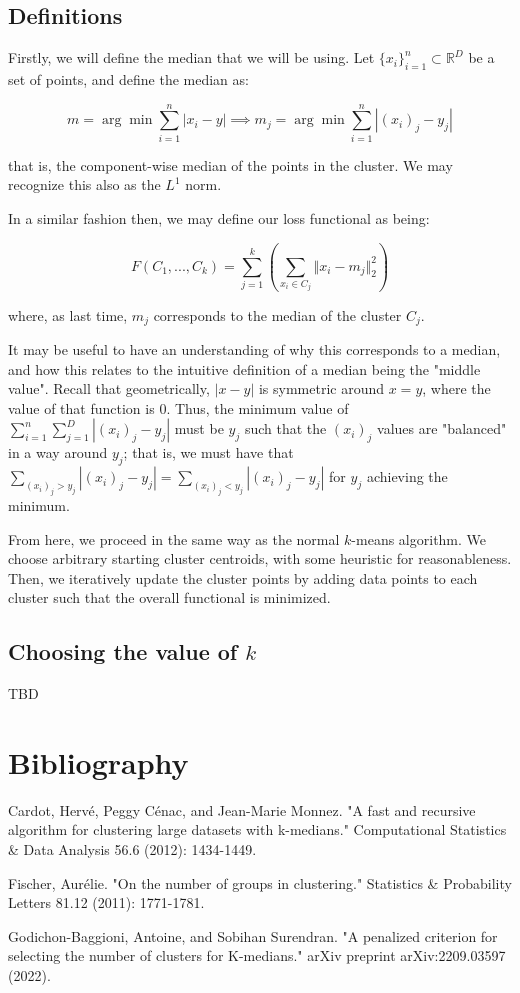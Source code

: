 \documentclass[10pt]{article}
\begin{document}
\subsection{Definitions}

Firstly, we will define the median that we will be using. Let $\{ x_i \}_{i=1}^n \subset \mathbb{R}^D$ be a set of points, and define the median as:

$$ m = \arg \min \sum_{i=1}^n | x_i - y | \implies m_j =  \arg \min \sum_{i=1}^n | (x_i)_j - y_j | $$

that is, the component-wise median of the points in the cluster. We may recognize this also as the $L^1$ norm.

In a similar fashion then, we may define our loss functional as being:

$$F(C_1,...,C_k) = \sum_{j=1}^k \left( \sum_{x_i \in C_j} \Vert x_i - m_j \Vert_2^2 \right)$$

where, as last time, $m_j$ corresponds to the median of the cluster $C_j$.

It may be useful to have an understanding of why this corresponds to a median, and how this relates to the intuitive definition of a median being the "middle value". Recall that geometrically, $|x - y|$ is symmetric around $x = y$, where the value of that function is $0$. Thus, the minimum value of $ \sum_{i=1}^n \sum_{j=1}^D | (x_i)_j - y_j | $ must be $y_j$ such that the $(x_i)_j$ values are "balanced" in a way around $y_j$; that is, we must have that $\sum_{(x_i)_j > y_j} |  (x_i)_j - y_j| = \sum_{(x_i)_j < y_j} |  (x_i)_j - y_j|$ for $y_j$ achieving the minimum.

From here, we proceed in the same way as the normal $k$-means algorithm. We choose arbitrary starting cluster centroids, with some heuristic for reasonableness. Then, we iteratively update the cluster points by adding data points to each cluster such that the overall functional is minimized.

\subsection{Choosing the value of $k$}

TBD

\section{Bibliography}

Cardot, Hervé, Peggy Cénac, and Jean-Marie Monnez. "A fast and recursive algorithm for clustering large datasets with k-medians." Computational Statistics \& Data Analysis 56.6 (2012): 1434-1449.

Fischer, Aurélie. "On the number of groups in clustering." Statistics \& Probability Letters 81.12 (2011): 1771-1781.

Godichon-Baggioni, Antoine, and Sobihan Surendran. "A penalized criterion for selecting the number of clusters for K-medians." arXiv preprint arXiv:2209.03597 (2022).
\end{document}
